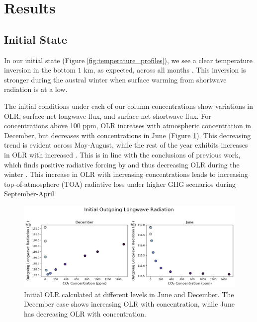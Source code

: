 \documentclass[12]{article}
\begin{document}
\section{Results}
\subsection{Initial State}
In our initial state (Figure \ref{fig:temperature_profiles}), we see a clear temperature inversion in the bottom $1$ km, as expected, across all months \citep{connolley_antarctic_1996}. This inversion is stronger during the austral winter when surface warming from shortwave radiation is at a low. 

The initial conditions under each of our column  concentrations show variations in OLR, surface net longwave flux, and surface net shortwave flux. For  concentrations above 100 ppm, OLR increases with atmospheric  concentration in December, but decreases with  concentrations in June (Figure \ref{fig:init_OLR}). This decreasing trend is evident across May-August, while the rest of the year exhibits increases in OLR with increased . This is in line with the conclusions of previous work, which finds positive radiative forcing by  and thus decreasing OLR during the winter \citep{schmithusen_how_2015}. This increase in OLR with increasing  concentrations leads to increasing top-of-atmosphere (TOA) radiative loss under higher GHG scenarios during September-April. 

\begin{figure}[htb!]
\noindent\includegraphics[width=1\textwidth]{figures/OLR_init.png}
\centering
\caption{Initial OLR calculated at different  levels in June and December. The December case shows increasing OLR with concentration, while June has decreasing OLR with concentration.}
\label{fig:init_OLR}
\end{figure}
\end{document}
